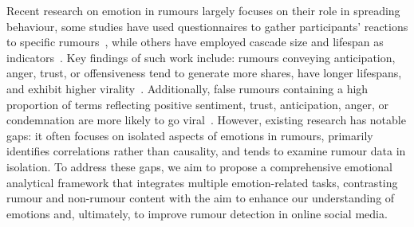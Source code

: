 Recent research on emotion in rumours largely focuses on their role in spreading behaviour, some studies have used questionnaires to gather participants’ reactions to specific rumours~\citep{Zhang2022EMOTIONALCI,RIJO2023107619, ALI2022107307}, while others have employed cascade size and lifespan as indicators~\cite{Prllochs2021EmotionsIO,Prllochs2021EmotionsED}. Key findings of such work include: rumours conveying anticipation, anger, trust, or offensiveness tend to generate more shares, have longer lifespans, and exhibit higher virality~\citep{Prllochs2021EmotionsIO}. Additionally, false rumours containing a high proportion of terms reflecting positive sentiment, trust, anticipation, anger, or condemnation are more likely to go viral~\citep{solovev2022moralemotionsshapevirality,Prllochs2021EmotionsED}. However, existing research has notable gaps: it often focuses on isolated aspects of emotions in rumours, primarily identifies correlations rather than causality, and tends to examine rumour data in isolation. To address these gaps, we aim to propose a comprehensive emotional analytical framework that integrates multiple emotion-related tasks, contrasting rumour and non-rumour content with the aim to enhance our understanding of emotions and, ultimately, to improve rumour detection in online social media.



